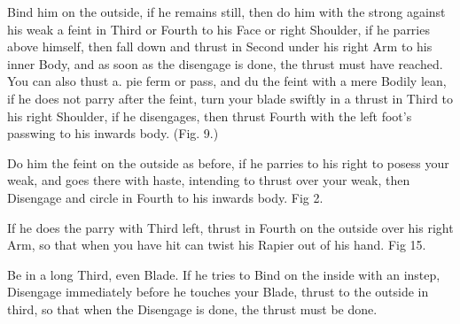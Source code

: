 \exercise{}
Bind him on the outside, if he remains still, then do him with the
strong against his weak a feint in Third or Fourth to his Face or
right Shoulder, if he parries above himself, then fall down and thrust
in Second under his right Arm to his inner Body, and as soon as the
disengage is done, the thrust must have reached. You can also thust
a. pie ferm or pass, and du the feint with a mere Bodily lean, if he
does not parry after the feint, turn your blade swiftly in a thrust in
Third to his right Shoulder, if he disengages, then thrust Fourth with
the left foot's passwing to his inwards body. (Fig. 9.)

\exercise{}
Do him the feint on the outside as before, if he parries to his right
to posess your weak, and goes there with haste, intending to thrust
over your weak, then Disengage and circle in Fourth to his inwards
body. Fig 2.

\exercise{}
If he does the parry with Third left, thrust in Fourth on the outside over his right Arm, so that when you have hit can twist his Rapier out of his hand. Fig 15.

\exercise{}
Be in a long Third, even Blade. If he tries to Bind on the inside
with an instep, Disengage immediately before he touches your
Blade, thrust to the outside in third, so that when the Disengage
is done, the thrust must be done.

